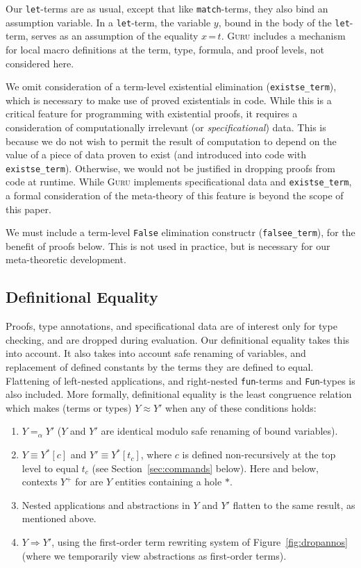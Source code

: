 \documentclass{fundam}
\newcommand{\Eq}[0]{\texttt{=}}
\newcommand{\To}{\Rightarrow}
\begin{document}
Our \texttt{let}-terms are as usual, except that like
\texttt{match}-terms, they also bind an assumption variable.  In a
\texttt{let}-term, the variable $y$, bound in the body of the
\texttt{let}-term, serves as an assumption of the equality ${x\, \Eq\,
t}$.  \textsc{Guru} includes a mechanism for local macro definitions
at the term, type, formula, and proof levels, not considered here.

We omit consideration of a term-level existential elimination
(\texttt{existse\_term}), which is necessary to make use of proved
existentials in code.  While this is a critical feature for
programming with existential proofs, it requires a consideration of
computationally irrelevant (or \emph{specificational}) data.  This is
because we do not wish to permit the result of computation to depend
on the value of a piece of data proven to exist (and introduced into
code with \texttt{existse\_term}).  Otherwise, we would not be
justified in dropping proofs from code at runtime.  While \textsc{Guru}
implements specificational data and \texttt{existse\_term}, a formal
consideration of the meta-theory of this feature is beyond the scope
of this paper.

We must include a term-level \texttt{False} elimination constructr
(\texttt{falsee\_term}), for the benefit of proofs below.  This is not
used in practice, but is necessary for our meta-theoretic development.

\subsection{Definitional Equality}
\label{sec:defeq}

Proofs, type annotations, and specificational data are of interest
only for type checking, and are dropped during evaluation.  Our
definitional equality takes this into account.  It also takes into
account safe renaming of variables, and replacement of defined
constants by the terms they are defined to equal.  Flattening of
left-nested applications, and right-nested \texttt{fun}-terms and
\texttt{Fun}-types is also included.  More formally, definitional
equality is the least congruence relation which makes (terms or types)
$Y \approx Y'$ when any of these conditions holds:
\begin{enumerate}
\item $Y =_\alpha Y'$ ($Y$ and $Y'$ are identical modulo safe renaming
of bound variables).
\item $Y \equiv Y^*[c]$ and $Y' \equiv Y^*[t_c]$, where $c$ is defined
non-recursively at the top level to equal $t_c$ (see
Section~\ref{sec:commands} below).  Here and below, contexts $Y^+$ for
are $Y$ entities containing a hole $*$.
\item Nested applications and abstractions in $Y$ and $Y'$ flatten
to the same result, as mentioned above.
\item $Y \To Y'$, using the first-order term rewriting system of
Figure~\ref{fig:dropannos} (where we temporarily view abstractions
as first-order terms).
\end{enumerate}
\end{document}

